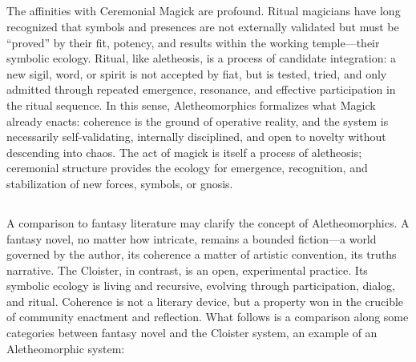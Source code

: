 \subsection*{}

The affinities with Ceremonial Magick are profound. Ritual magicians have long
recognized that symbols and presences are not externally validated but must be
“proved” by their fit, potency, and results within the working temple—their
symbolic ecology. Ritual, like aletheosis, is a process of candidate
integration: a new sigil, word, or spirit is not accepted by fiat, but is
tested, tried, and only admitted through repeated emergence, resonance, and
effective participation in the ritual sequence. In this sense, Aletheomorphics
formalizes what Magick already enacts: coherence is the ground of operative
reality, and the system is necessarily self-validating, internally disciplined,
and open to novelty without descending into chaos. The act of magick is itself
a process of aletheosis; ceremonial structure provides the ecology for
emergence, recognition, and stabilization of new forces, symbols, or gnosis.

\subsection*{}

A comparison to fantasy literature may clarify the concept of Aletheomorphics.
A fantasy novel, no matter how intricate, remains a bounded fiction—a world
governed by the author, its coherence a matter of artistic convention, its
truths narrative. The Cloister, in contrast, is an open, experimental practice.
Its symbolic ecology is living and recursive, evolving through participation,
dialog, and ritual. Coherence is not a literary device, but a property won in
the crucible of community enactment and reflection.  What follows is a
comparison along some categories between fantasy novel and the Cloister system,
an example of an Aletheomorphic system:

